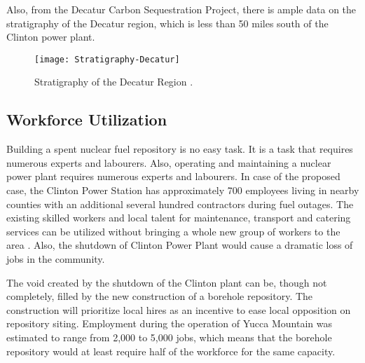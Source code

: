  \fi
  
  
  Also, from the Decatur Carbon Sequestration Project, there is ample data
  on the stratigraphy of the Decatur region, which is less than 50 miles south
  of the Clinton power plant.
 
  
  
  
\begin{figure}[!h] 
  \centering
  \texttt{[image: Stratigraphy-Decatur]}	
  \caption{Stratigraphy of the Decatur Region
  \cite{mcdonald_illinois_2012}.}
  \label{fig:Stratigraphy}
\end{figure}
  

\subsection{Workforce Utilization}



Building a spent nuclear fuel repository is no easy task. It is a task that requires
numerous experts and labourers. Also, operating and maintaining a nuclear power plant
requires numerous experts and labourers. In case of the proposed case, the Clinton
 Power Station has approximately 700 employees living in nearby counties with an
additional several hundred contractors during fuel 
outages\cite{exelon_clinton_2016}.
The existing skilled workers and local talent for maintenance, transport and catering
services can be utilized without bringing a whole new group of workers to the 
area \cite{iaea_managing_2008}. Also, the shutdown of Clinton Power Plant would cause a dramatic
loss of jobs in the community. 




The void created by the shutdown of the Clinton plant can be, though not
completely, filled by the new construction of a borehole repository. The construction
will prioritize local hires as an incentive to ease local opposition on repository
 siting. Employment during the operation of Yucca Mountain was estimated to range from
 2,000 to 5,000 jobs, \cite{riddel_economic_2003} which means that the borehole repository
 would at least require half of the workforce for the same capacity. 


